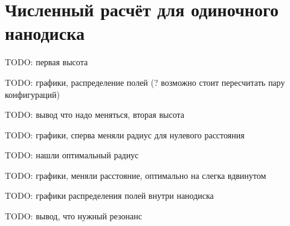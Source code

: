 \section{Численный расчёт для одиночного нанодиска}

TODO: первая высота

TODO: графики, распределение полей (? возможно стоит пересчитать пару конфигураций)

TODO: вывод что надо меняться, вторая высота

TODO: графики, сперва меняли радиус для нулевого расстояния

TODO: нашли оптимальный радиус

TODO: графики, меняли расстояние, оптимально на слегка вдвинутом

TODO: графики распределения полей внутри нанодиска

TODO: вывод, что нужный резонанс